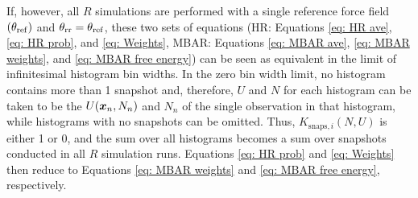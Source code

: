 \documentclass[journal=jced,manuscript=article]{achemso}
\newcommand{\bfv}[1]{{\mbox{\boldmath{$#1$}}}}
\newcommand{\x}{\bfv{x}}
\begin{document}
If, however, all $R$ simulations are performed with a single reference force field $(\theta_{\rm ref})$ and $\theta_{\rm rr} = \theta_{\rm ref}$, these two sets of equations (HR: Equations \ref{eq: HR ave}, \ref{eq: HR prob}, and \ref{eq: Weights}, MBAR: Equations \ref{eq: MBAR ave}, \ref{eq: MBAR weights}, and \ref{eq: MBAR free energy}) can be seen as equivalent in the limit of infinitesimal histogram bin widths. In the zero bin width limit, no histogram contains more than 1 snapshot and, therefore, $U$ and $N$ for each histogram can be taken to be the $U(\x_n,N_n)$ and $N_n$ of the single observation in that histogram, while histograms with no snapshots can be omitted. Thus, $K_{\mathrm{snaps},i}(N,U)$ is either 1 or 0, and the sum over all histograms becomes a sum over snapshots conducted in all $R$ simulation runs. Equations \ref{eq: HR prob} and \ref{eq: Weights} then reduce to Equations \ref{eq: MBAR weights} and \ref{eq: MBAR free energy}, respectively.

\end{document}
